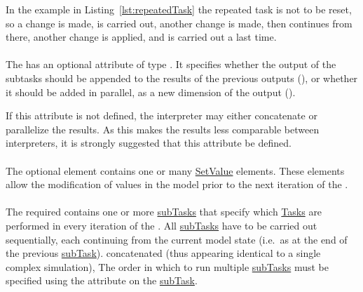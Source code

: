 In the example in  Listing~\ref{lst:repeatedTask} the repeated task is not to be reset, so a change is made,  is carried out, another change is made, then  continues from there, another change is applied, and  is carried out a last time.


\begin{blockChanged}
\paragraph*{}
\label{sec:concatenateAttribute}
The \RepeatedTask has an optional attribute  of type . It specifies whether the output of the subtasks should be appended to the results of the previous outputs (), or whether it should be added in parallel, as a new dimension of the output ().

If this attribute is not defined, the interpreter may either concatenate or parallelize the results.  As this makes the results less comparable between interpreters, it is strongly suggested that this attribute be defined.
\end{blockChanged}

\paragraph*{}
\label{sec:changesRepeatedTask}
The optional  element contains one or many \hyperref[class:setValue]{SetValue} elements. These elements allow the modification of values in the model  prior to the next iteration of the \RepeatedTask.

\paragraph*{}
\label{class:listOfSubTasks}
The required  contains one or more \hyperref[class:subTask]{subTasks} that specify which \hyperref[class:abstractTask]{Tasks} are performed in every iteration of the \RepeatedTask. All \hyperref[class:subTask]{subTasks} have to be carried out sequentially, each continuing from the current model state  (i.e.\ as at the end of the previous \hyperref[class:subTask]{subTask}).   concatenated (thus appearing identical to a single complex simulation),  The order in which to run multiple \hyperref[class:subTask]{subTasks} must be specified using the \hyperref[sec:subTaskOrder]{} attribute on the \hyperref[class:subTask]{subTask}.  

